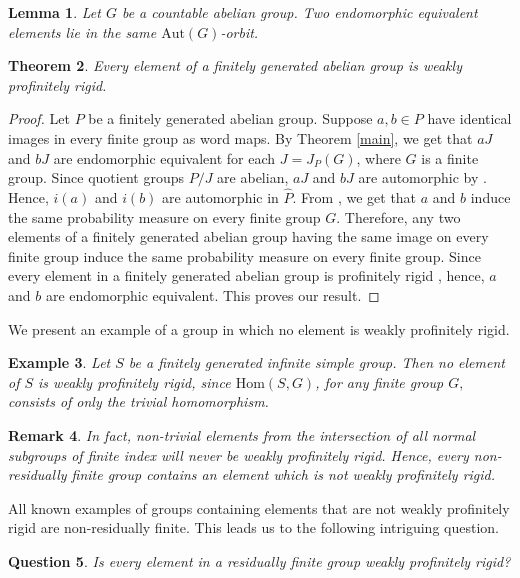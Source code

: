 \documentclass[12pt]{amsart}
\newtheorem{theorem}{Theorem}[section]
\newtheorem{lemma}[theorem]{Lemma}
\newtheorem{ex}[theorem]{Example}
\newtheorem{qu}[theorem]{Question}
\newtheorem{rem}[theorem]{Remark}
\begin{document}
 \begin{lemma}\cite{calvert2013degeneration}
     Let $G$ be a countable abelian group. Two endomorphic equivalent elements lie in the same $\mathrm{Aut}(G)$-orbit. 
 \end{lemma}

\begin{theorem}
    Every element of a finitely generated abelian group is weakly profinitely rigid.
\end{theorem}
\begin{proof}
    Let $P$ be a finitely generated abelian group. Suppose $a, b \in P$ have identical images in every finite group as word maps. By Theorem \ref{main}, we get that $aJ$ and $bJ$ are endomorphic equivalent for each $J = J_P(G)$, where $G$ is a finite group. Since quotient groups $P/J$ are abelian, $aJ$ and $bJ$ are automorphic by \cite{calvert2013degeneration}. Hence, $i(a)$ and $i(b)$ are automorphic in $\widehat{P}$. From \cite[Theorem~2.2]{hanany2020some}, we get that $a$ and $b$ induce the same probability measure on every finite group $G$. Therefore, any two elements of a finitely generated abelian group having the same image on every finite group induce the same probability measure on every finite group. Since every element in a finitely generated abelian group is profinitely rigid \cite{hanany2020some}, hence, $a$ and $b$ are endomorphic equivalent. This proves our result.
\end{proof}
 
We present an example of a group in which no element is weakly profinitely rigid.
\begin{ex}
    Let $S$ be a finitely generated infinite simple group. Then no element of $S$ is weakly profinitely rigid, since $\mathrm{Hom}(S,G)$, for any finite group $G,$ consists of only the trivial homomorphism.
\end{ex}

 \begin{rem}
     In fact, non-trivial elements from the intersection of all normal subgroups of finite index will never be weakly profinitely rigid. Hence, every non-residually finite group contains an element which is not weakly profinitely rigid. 
 \end{rem}

All known examples of groups containing elements that are not weakly profinitely rigid are non-residually finite. This leads us to the following intriguing question.

\begin{qu}
    Is every element in a residually finite group weakly profinitely rigid?
\end{qu}  
\end{document}
